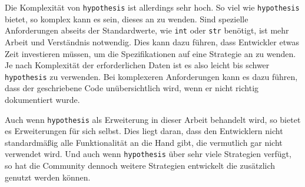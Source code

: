 Die Komplexität von \lstinline{hypothesis} ist allerdings sehr hoch. So viel wie
\lstinline{hypothesis} bietet, so komplex kann es sein, dieses an zu wenden.
Sind spezielle Anforderungen abseits der Standardwerte, wie
\lstinline{int} oder \lstinline{str} benötigt, ist mehr Arbeit und Verständnis
notwendig. Dies kann dazu führen, dass Entwickler etwas Zeit investieren
müssen, um die Spezifikationen auf eine Strategie an zu wenden. Je nach
Komplexität der erforderlichen Daten ist es also leicht bis schwer
\lstinline{hypothesis} zu verwenden. Bei komplexeren Anforderungen kann es dazu
führen, dass der geschriebene Code unübersichtlich wird, wenn er nicht richtig
dokumentiert wurde.

Auch wenn \lstinline{hypothesis} als Erweiterung in dieser Arbeit behandelt
wird, so bietet es Erweiterungen für sich selbst. Dies liegt daran, dass
den Entwicklern nicht standardmäßig alle Funktionalität an die Hand gibt, die
vermutlich gar nicht verwendet wird. Und auch wenn \lstinline{hypothesis} über
sehr viele Strategien verfügt, so hat die Community dennoch weitere Strategien
entwickelt die zusätzlich genutzt werden können.